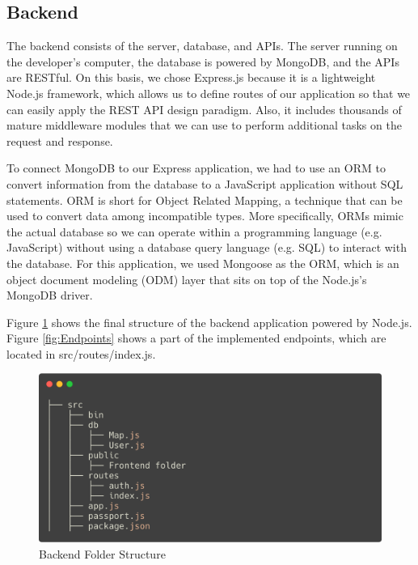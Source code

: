 \subsection{Backend}
The backend consists of the server, database, and APIs. The server running on the developer's computer, the database is powered by MongoDB, and the APIs are RESTful. On this basis, we chose Express.js because it is a lightweight Node.js framework, which allows us to define routes of our application so that we can easily apply the REST API design paradigm. Also, it includes thousands of mature middleware modules that we can use to perform additional tasks on the request and response.

To connect MongoDB to our Express application, we had to use an ORM to convert information from the database to a JavaScript application without SQL statements. ORM is short for Object Related Mapping, a technique that can be used to convert data among incompatible types. More specifically, ORMs mimic the actual database so we can operate within a programming language (e.g. JavaScript) without using a database query language (e.g. SQL) to interact with the database. For this application, we used Mongoose as the ORM, which is an object document modeling (ODM) layer that sits on top of the Node.js's MongoDB driver.

Figure \ref{fig:Backend Folder Structure} shows the final structure of the backend application powered by Node.js. Figure \ref{fig:Endpoints} shows a part of the implemented endpoints, which are located in src/routes/index.js.

\begin{figure}[htbp]
  \centering
  \includegraphics[width=\textwidth]{section04/assets/Backend.png}
  \caption{Backend Folder Structure}
  \label{fig:Backend Folder Structure}
\end{figure}

